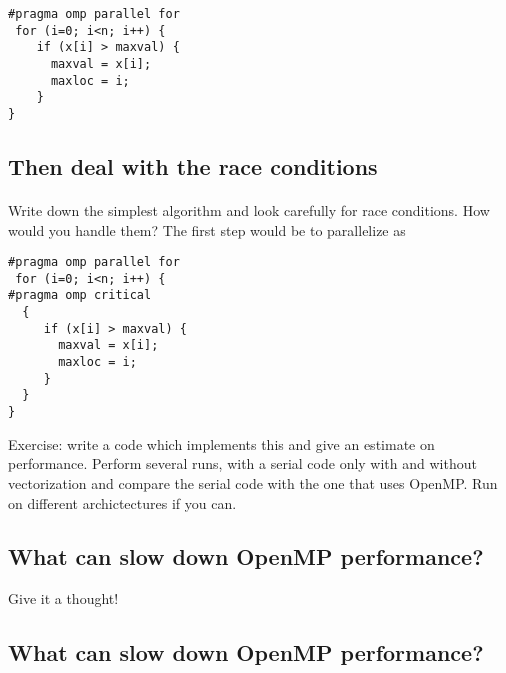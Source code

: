 \documentclass[%
oneside,                 %
final,                   %
10pt]{article}
\begin{document}
\begin{verbatim}
#pragma omp parallel for
 for (i=0; i<n; i++) {
    if (x[i] > maxval) {
      maxval = x[i];
      maxloc = i; 
    }
}

\end{verbatim}



\subsection*{Then deal with the race conditions}

\paragraph{}
Write down the simplest algorithm and look carefully for race conditions. How would you handle them? 
The first step would be to parallelize as 











\begin{verbatim}
#pragma omp parallel for
 for (i=0; i<n; i++) {
#pragma omp critical
  {
     if (x[i] > maxval) {
       maxval = x[i];
       maxloc = i; 
     }
  }
} 

\end{verbatim}


Exercise: write a code which implements this and give an estimate on performance. Perform several runs,
with a serial code only with and without vectorization and compare the serial code with the one that  uses OpenMP. Run on different archictectures if you can.


\subsection*{What can slow down OpenMP performance?}
Give it a thought!

\subsection*{What can slow down OpenMP performance?}
\end{document}
